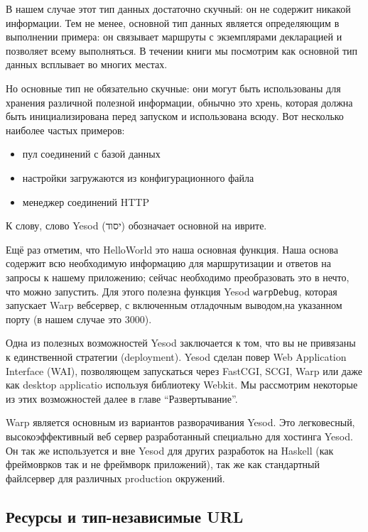 В нашем случае этот тип данных достаточно скучный: он не содержит никакой информации. 
Тем не менее, основной тип данных является определяющим в выполнении примера: 
он связывает маршруты с экземплярами декларацией и позволяет всему выполняться. 
В течении книги мы посмотрим как основной тип данных всплывает во многих местах.

Но основные тип не обязательно скучные: они могут быть использованы для 
хранения различной полезной
информации, обнычно это хрень, которая должна быть инициализирована перед запуском и 
использована всюду. Вот несколько наиболее частых примеров:

\begin{itemize}
  \item пул соединений с базой данных
  \item настройки загружаются из конфигурационного файла
  \item менеджер соединений HTTP
\end{itemize}

К слову, слово Yesod (יסוד) обозначает основной на иврите.


Ещё раз отметим, что HelloWorld это наша основная функция. Наша основа содержит всю
необходимую информацию для маршрутизации и ответов на запросы к нашему приложению;
сейчас необходимо преобразовать это в нечто, что можно запустить. Для этого полезна
функция Yesod \lstinline'warpDebug', которая запускает Warp вебсервер, с включенным отладочным
выводом,на указанном порту (в нашем случае это 3000).

Одна из полезных возможностей Yesod заключается к том, что вы не привязаны к единственной
стратегии (deployment). Yesod сделан повер Web Application Interface (WAI), позволяющем
запускаться через FastCGI, SCGI, Warp или даже как desktop applicatio используя библиотеку
Webkit. Мы рассмотрим некоторые из этих возможностей далее в главе ``Развертывание''.

Warp является основным из вариантов разворачивания Yesod. Это легковесный, высокоэффективный
веб сервер разработанный специально для хостинга Yesod. Он так же используется и вне Yesod
для других разработок на Haskell (как фреймоврков так и не фреймворк приложений), так же 
как стандартный файлсервер для различных production окружений.

\subsection{Ресурсы и тип-независимые URL}

